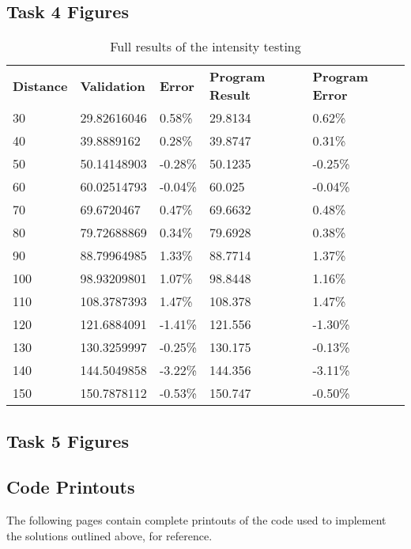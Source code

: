 \documentclass[conference]{IEEEtran}
\begin{document}
\subsection{Task 4 Figures}\label{app:T4}
\begin{table}[]
\caption{Full results of the intensity testing}
\label{tab:T4_full}
\begin{tabular}{lllll}
\textbf{Distance} & \textbf{Validation} & \textbf{Error} & \textbf{Program Result} & \textbf{Program Error} \\
30                & 29.82616046         & 0.58\%         & 29.8134                 & 0.62\%                 \\
40                & 39.8889162          & 0.28\%         & 39.8747                 & 0.31\%                 \\
50                & 50.14148903         & -0.28\%        & 50.1235                 & -0.25\%                \\
60                & 60.02514793         & -0.04\%        & 60.025                  & -0.04\%                \\
70                & 69.6720467          & 0.47\%         & 69.6632                 & 0.48\%                 \\
80                & 79.72688869         & 0.34\%         & 79.6928                 & 0.38\%                 \\
90                & 88.79964985         & 1.33\%         & 88.7714                 & 1.37\%                 \\
100               & 98.93209801         & 1.07\%         & 98.8448                 & 1.16\%                 \\
110               & 108.3787393         & 1.47\%         & 108.378                 & 1.47\%                 \\
120               & 121.6884091         & -1.41\%        & 121.556                 & -1.30\%                \\
130               & 130.3259997         & -0.25\%        & 130.175                 & -0.13\%                \\
140               & 144.5049858         & -3.22\%        & 144.356                 & -3.11\%                \\
150               & 150.7878112         & -0.53\%        & 150.747                 & -0.50\%               
\end{tabular}
\end{table}

\subsection{Task 5 Figures}\label{app:T5}

\subsection{Code Printouts}
The following pages contain complete printouts of the code used to implement the solutions outlined above, for reference.
%
%
%
\end{document}
